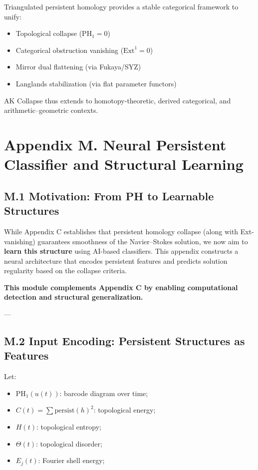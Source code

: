 \documentclass[11pt]{article}
\theoremstyle{definition}
\begin{document}
Triangulated persistent homology provides a stable categorical framework to unify:

\begin{itemize}
  \item Topological collapse (\( \mathrm{PH}_1 = 0 \))  
  \item Categorical obstruction vanishing (\( \mathrm{Ext}^1 = 0 \))  
  \item Mirror dual flattening (via Fukaya/SYZ)  
  \item Langlands stabilization (via flat parameter functors)  
\end{itemize}

AK Collapse thus extends to homotopy-theoretic, derived categorical, and arithmetic–geometric contexts.


\section*{Appendix M. Neural Persistent Classifier and Structural Learning}

\subsection*{M.1 Motivation: From PH to Learnable Structures}

While Appendix C establishes that persistent homology collapse (along with Ext-vanishing) guarantees smoothness of the Navier--Stokes solution,  
we now aim to \textbf{learn this structure} using AI-based classifiers. This appendix constructs a neural architecture that encodes persistent features and predicts solution regularity based on the collapse criteria.

\textbf{This module complements Appendix C by enabling computational detection and structural generalization.}

---

\subsection*{M.2 Input Encoding: Persistent Structures as Features}

Let:
\begin{itemize}
  \item \( \mathrm{PH}_1(u(t)) \): barcode diagram over time;
  \item \( C(t) = \sum \mathrm{persist}(h)^2 \): topological energy;
  \item \( H(t) \): topological entropy;
  \item \( \Theta(t) \): topological disorder;
  \item \( E_j(t) \): Fourier shell energy;
\end{itemize}
\end{document}
